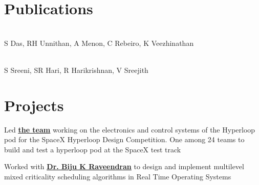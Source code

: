 \documentclass[]{illustris-resume-openfont}
\newcommand{\myul}[2][black]{\setulcolor{#1}\ul{#2}\setulcolor{black}}
\begin{document}
\begin{minipage}[t]{0.66\textwidth}

\section{Publications}

\\
S Das, RH Unnithan, A Menon, C Rebeiro, K Veezhinathan
\vspace{\topsep} %

\\
S Sreeni, SR Hari, R Harikrishnan, V Sreejith


\section{Projects}

Led \textbf{\href{https://www.facebook.com/teamhyperloopindia}{\color{blue} \myul[blue] {the team}}} working on the electronics and control systems of the Hyperloop pod for the SpaceX Hyperloop Design Competition. One among 24 teams to build and test a hyperloop pod at the SpaceX test track

Worked with \textbf{\href{http://universe.bits-pilani.ac.in/goa/biju/profile}{\color{blue} \myul[blue] {Dr. Biju K Raveendran}}} to design and implement multilevel mixed criticality scheduling algorithms in Real Time Operating Systems



\end{minipage}
\end{document}
